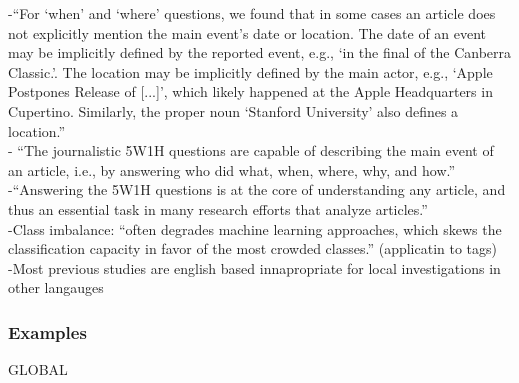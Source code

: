 -{\color{orange}“For ‘when’ and ‘where’ questions, we found that in some cases an article does not explicitly mention the main event’s date or location. The date of an event may be implicitly defined by the reported event, e.g., ‘in the final of the Canberra Classic.’. The location may be implicitly defined by the main actor, e.g., ‘Apple Postpones Release of [...]’, which likely happened at the Apple Headquarters in Cupertino. Similarly, the proper noun ‘Stanford University’ also defines a location.”\cite{Hamborg2019}}\\
-{\color{orange} “The journalistic 5W1H questions are capable of describing the main event of an article, i.e., by answering who did what, when, where, why, and how.”\cite{Hamborg2019}}\\
-{\color{orange}“Answering the 5W1H questions is at the core of understanding any article, and thus an essential task in many research efforts that analyze articles.”\cite{Hamborg2019}}\\
-{\color{orange}Class imbalance: “often degrades machine learning approaches, which skews the classification capacity in favor of the most crowded classes.” (applicatin to tags)\cite{Rivera2020}}\\
-{\color{orange}Most previous studies are english based\cite{Rivera2020}} {\color{purple}innapropriate for local investigations in other langauges}\\

\subsubsection{Examples}
GLOBAL

